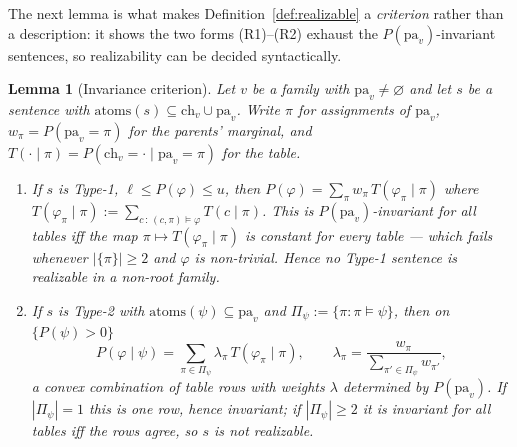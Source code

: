 \documentclass[11pt]{article}
\newtheorem{lemma}{Lemma}
\theoremstyle{definition}
\newcommand{\ch}{\mathrm{ch}}
\newcommand{\pa}{\mathrm{pa}}
\newcommand{\atoms}{\mathrm{atoms}}
\begin{document}
The next lemma is what makes Definition~\ref{def:realizable} a \emph{criterion} rather than a
description: it shows the two forms (R1)--(R2) exhaust the $P(\pa_v)$-invariant sentences, so
realizability can be decided syntactically.

\begin{lemma}[Invariance criterion]\label{lem:invariance}
Let $v$ be a family with $\pa_v\ne\varnothing$ and let $s$ be a sentence with
$\atoms(s)\subseteq\ch_v\cup\pa_v$. Write $\pi$ for assignments of $\pa_v$, $w_\pi=P(\pa_v{=}\pi)$
for the parents' marginal, and $T(\cdot\mid\pi)=P(\ch_v{=}\cdot\mid\pa_v{=}\pi)$ for the table.
\begin{enumerate}
  \item[\textup{(i)}] If $s$ is Type-1, $\ell\le P(\varphi)\le u$, then
    $P(\varphi)=\sum_\pi w_\pi\,T(\varphi_\pi\mid\pi)$ where
    $T(\varphi_\pi\mid\pi):=\sum_{c\,:\,(c,\pi)\models\varphi}T(c\mid\pi)$. This is
    $P(\pa_v)$-invariant for all tables iff the map $\pi\mapsto T(\varphi_\pi\mid\pi)$ is constant
    for every table --- which fails whenever $|\{\pi\}|\ge2$ and $\varphi$ is non-trivial. Hence no
    Type-1 sentence is realizable in a non-root family.
  \item[\textup{(ii)}] If $s$ is Type-2 with $\atoms(\psi)\subseteq\pa_v$ and
    $\Pi_\psi:=\{\pi:\pi\models\psi\}$, then on $\{P(\psi)>0\}$
    \begin{equation}\label{eq:mixture}
      P(\varphi\mid\psi)=\sum_{\pi\in\Pi_\psi}\lambda_\pi\,T(\varphi_\pi\mid\pi),
      \qquad
      \lambda_\pi=\frac{w_\pi}{\sum_{\pi'\in\Pi_\psi}w_{\pi'}},
    \end{equation}
    a convex combination of table rows with weights $\lambda$ determined by $P(\pa_v)$. If
    $|\Pi_\psi|=1$ this is one row, hence invariant; if $|\Pi_\psi|\ge2$ it is invariant for all
    tables iff the rows agree, so $s$ is \emph{not} realizable.
\end{enumerate}
\end{lemma}
\end{document}
